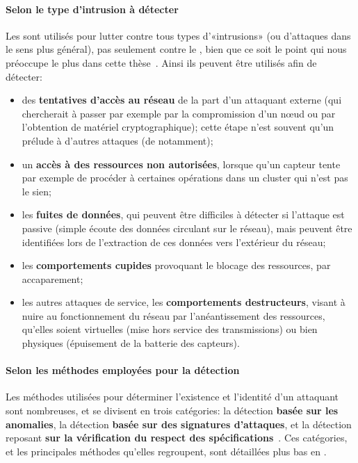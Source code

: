         \paragraph{Selon le type d'intrusion à détecter}
Les \IDS sont utilisés pour lutter contre tous types d'«intrusions» (ou d'attaques dans le sens plus général), pas seulement contre le \dds, bien que ce soit le point qui nous préoccupe le plus dans cette thèse~\cite{BMS13}.
Ainsi ils peuvent être utilisés afin de détecter:
\begin{itemize}
    \item des \textbf{tentatives d'accès au réseau} de la part d'un attaquant externe (qui chercherait à passer par exemple par la compromission d'un nœud ou par l'obtention de matériel cryptographique); cette étape n'est souvent qu'un prélude à d'autres attaques (de \dds notamment);
    \item un \textbf{accès à des ressources non autorisées}, lorsque qu'un capteur tente par exemple de procéder à certaines opérations dans un cluster qui n'est pas le sien;
    \item les \textbf{fuites de données}, qui peuvent être difficiles à détecter si l'attaque est passive (simple écoute des données circulant sur le réseau), mais peuvent être identifiées lors de l'extraction de ces données vers l'extérieur du réseau;
    \item les \textbf{comportements cupides} provoquant le blocage des ressources, par accaparement;
    \item les autres attaques de service, \cad les \textbf{comportements destructeurs}, visant à nuire au fonctionnement du réseau par l'anéantissement des ressources, qu'elles soient virtuelles (mise hors service des transmissions) ou bien physiques (épuisement de la batterie des capteurs).
\end{itemize}

        \paragraph{Selon les méthodes employées pour la détection}
Les méthodes utilisées pour déterminer l'existence et l'identité d'un attaquant sont nombreuses, et se divisent en trois catégories: la détection \textbf{basée sur les anomalies}, la détection \textbf{basée sur des signatures d'attaques}, et la détection reposant \textbf{sur la vérification du respect des spécifications}~\cite{BMS13}.
Ces catégories, et les principales méthodes qu'elles regroupent, sont détaillées plus bas en .

